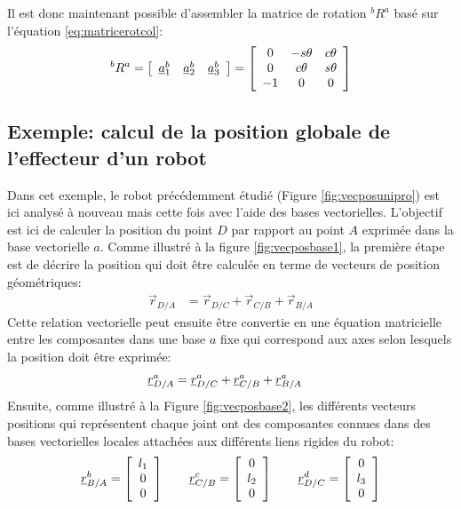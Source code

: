 Il est donc maintenant possible d'assembler la matrice de rotation $^bR^a$ basé sur l'équation \eqref{eq:matricerotcol}:
\begin{align}
^bR^a =\left[ \begin{array}{c c c}
	\underline{a}_1^b  & \underline{a}_2^b & \underline{a}_3^b
\end{array}  \right]
= \left[ \begin{array}{c c c}
	0 & -s\theta & c\theta \\
	0 & c\theta & s\theta \\
-1 & 0 & 0 
\end{array}  \right]
\end{align}


\subsection{Exemple: calcul de la position globale de l'effecteur d'un robot}
\label{sec:exer-cinematique-base}
%
Dans cet exemple, le robot précédemment étudié (Figure \ref{fig:vecposunipro}) est ici analysé à nouveau mais cette fois avec l'aide des bases vectorielles. L'objectif est ici de calculer la position du point $D$ par rapport au point $A$ exprimée dans la base vectorielle $a$. Comme illustré à la figure \ref{fig:vecposbase1}, la première étape est de décrire la position qui doit être calculée en terme de vecteurs de position géométriques:
\begin{align}
\vec{r}_{D/A} &= \vec{r}_{D/C} + \vec{r}_{C/B} + \vec{r}_{B/A}
\end{align} 
Cette relation vectorielle peut ensuite être convertie en une équation matricielle entre les composantes dans une base $a$ fixe qui correspond aux axes selon lesquels la position doit être exprimée:
\begin{align}
\underline{r}_{D/A}^a &= \underline{r}_{D/C}^a + \underline{r}_{C/B}^a + \underline{r}_{B/A}^a
\label{eq:exaddbase}
\end{align} 
Ensuite, comme illustré à la Figure \ref{fig:vecposbase2}, les différents vecteurs positions qui représentent chaque joint ont des composantes connues dans des bases vectorielles locales attachées aux différents liens rigides du robot:
\begin{align}
\underline{r}_{B/A}^b = 
\left[ \begin{array}{c} 
l_1 \\ 0 \\ 0
\end{array} \right] 
\quad\quad
\underline{r}_{C/B}^c = 
\left[ \begin{array}{c} 
0 \\ l_2 \\ 0
\end{array} \right]
\quad\quad
\underline{r}_{D/C}^d = 
\left[ \begin{array}{c} 
0 \\ l_3 \\ 0
\end{array} \right] 
\end{align} 

